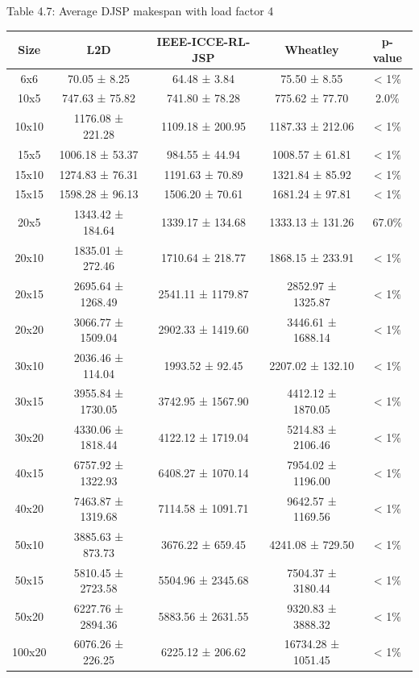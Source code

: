 \begin{table}[H]
    Table 4.7: Average DJSP makespan with load factor 4\\
    \vspace{1mm}
    \footnotesize 
    \begin{tabular}{ccccc}
    \toprule
    Size & L2D & IEEE-ICCE-RL-JSP & Wheatley & p-value \\
    \midrule
    6x6 & 70.05 ± 8.25 & 64.48 ± 3.84 & 75.50 ± 8.55 & < 1$\%$ \\
    10x5 & 747.63 ± 75.82 & 741.80 ± 78.28 & 775.62 ± 77.70 & 2.0$\%$ \\
    10x10 & 1176.08 ± 221.28 & 1109.18 ± 200.95 & 1187.33 ± 212.06 & < 1$\%$ \\
    15x5 & 1006.18 ± 53.37 & 984.55 ± 44.94 & 1008.57 ± 61.81 & < 1$\%$ \\
    15x10 & 1274.83 ± 76.31 & 1191.63 ± 70.89 & 1321.84 ± 85.92 & < 1$\%$ \\
    15x15 & 1598.28 ± 96.13 & 1506.20 ± 70.61 & 1681.24 ± 97.81 & < 1$\%$ \\
    20x5 & 1343.42 ± 184.64 & 1339.17 ± 134.68 & 1333.13 ± 131.26 & 67.0$\%$ \\
    20x10 & 1835.01 ± 272.46 & 1710.64 ± 218.77 & 1868.15 ± 233.91 & < 1$\%$ \\
    20x15 & 2695.64 ± 1268.49 & 2541.11 ± 1179.87 & 2852.97 ± 1325.87 & < 1$\%$ \\
    20x20 & 3066.77 ± 1509.04 & 2902.33 ± 1419.60 & 3446.61 ± 1688.14 & < 1$\%$ \\
    30x10 & 2036.46 ± 114.04 & 1993.52 ± 92.45 & 2207.02 ± 132.10 & < 1$\%$ \\
    30x15 & 3955.84 ± 1730.05 & 3742.95 ± 1567.90 & 4412.12 ± 1870.05 & < 1$\%$ \\
    30x20 & 4330.06 ± 1818.44 & 4122.12 ± 1719.04 & 5214.83 ± 2106.46 & < 1$\%$ \\
    40x15 & 6757.92 ± 1322.93 & 6408.27 ± 1070.14 & 7954.02 ± 1196.00 & < 1$\%$ \\
    40x20 & 7463.87 ± 1319.68 & 7114.58 ± 1091.71 & 9642.57 ± 1169.56 & < 1$\%$ \\
    50x10 & 3885.63 ± 873.73 & 3676.22 ± 659.45 & 4241.08 ± 729.50 & < 1$\%$ \\
    50x15 & 5810.45 ± 2723.58 & 5504.96 ± 2345.68 & 7504.37 ± 3180.44 & < 1$\%$ \\
    50x20 & 6227.76 ± 2894.36 & 5883.56 ± 2631.55 & 9320.83 ± 3888.32 & < 1$\%$ \\
    100x20 & 6076.26 ± 226.25 & 6225.12 ± 206.62 & 16734.28 ± 1051.45 & < 1$\%$ \\
    \bottomrule
    \end{tabular}
\end{table}
    


